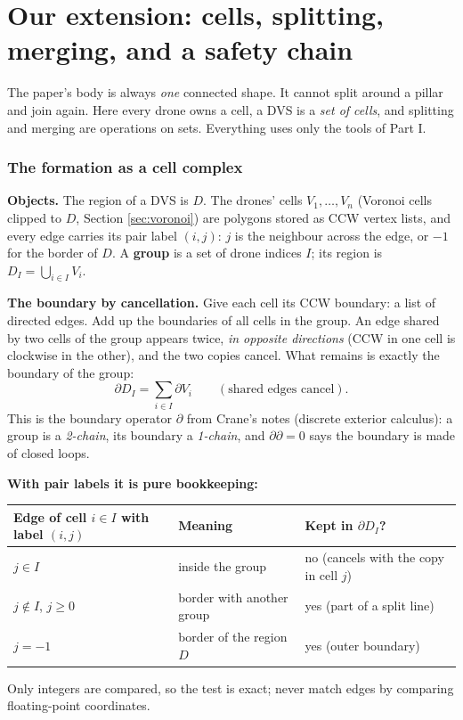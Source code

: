\documentclass[11pt,a4paper]{article}
\begin{document}
\part{Our extension: cells, splitting, merging, and a safety chain}

The paper's body is always \emph{one} connected shape. It cannot split around a pillar and join again. Here every drone
owns a cell, a DVS is a \emph{set of cells}, and splitting and merging are operations on sets. Everything uses only the
tools of Part I.

\section{The formation as a cell complex}\label{sec:complex}

\textbf{Objects.} The region of a DVS is $D$. The drones' cells $V_1,\dots,V_n$ (Voronoi cells clipped to $D$, Section
\ref{sec:voronoi}) are polygons stored as CCW vertex lists, and every edge carries its pair label $(i,j)$: $j$ is the
neighbour across the edge, or $-1$ for the border of $D$. A \textbf{group} is a set of drone indices $I$; its region is
$D_I=\bigcup_{i\in I}V_i$.

\textbf{The boundary by cancellation.} Give each cell its CCW boundary: a list of directed edges. Add up the boundaries
of all cells in the group. An edge shared by two cells of the group appears twice, \emph{in opposite directions}
(CCW in one cell is clockwise in the other), and the two copies cancel. What remains is exactly the boundary of the
group:
\[
\partial D_I=\sum_{i\in I}\partial V_i\qquad(\text{shared edges cancel}).
\]
This is the boundary operator $\partial$ from Crane's notes (discrete exterior calculus): a group is a \emph{2-chain},
its boundary a \emph{1-chain}, and $\partial\partial=0$ says the boundary is made of closed loops.

\textbf{With pair labels it is pure bookkeeping:}
\begin{center}\small
\begin{tabular}{@{}lll@{}}
\toprule
Edge of cell $i\in I$ with label $(i,j)$ & Meaning & Kept in $\partial D_I$?\\
\midrule
$j\in I$ & inside the group & no (cancels with the copy in cell $j$)\\
$j\notin I$, $j\ge0$ & border with another group & yes (part of a split line)\\
$j=-1$ & border of the region $D$ & yes (outer boundary)\\
\bottomrule
\end{tabular}
\end{center}
Only integers are compared, so the test is exact; never match edges by comparing floating-point coordinates.
\end{document}
